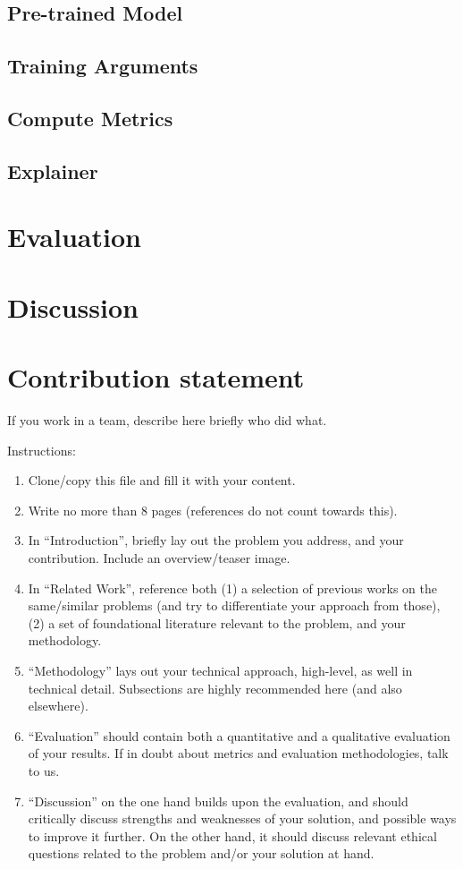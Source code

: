 \documentclass[11pt]{article}
\begin{document}
\subsection{Pre-trained Model}
\subsection{Training Arguments}
\subsection{Compute Metrics}
\subsection{Explainer}

\section{Evaluation}

\section{Discussion}


\section{Contribution statement}

If you work in a team, describe here briefly who did what.

Instructions: 
\begin{enumerate}
    \item Clone/copy this file and fill it with your content.
    \item Write no more than 8 pages (references do not count towards this).
    \item In ``Introduction'', briefly lay out the problem you address, and your contribution. Include an overview/teaser image.
    \item In ``Related Work'', reference both (1) a selection of previous works on the same/similar problems (and try to differentiate your approach from those), (2) a set of foundational literature relevant to the problem, and your methodology.
    \item ``Methodology'' lays out your technical approach, high-level, as well in technical detail. Subsections are highly recommended here (and also elsewhere).
    \item ``Evaluation'' should contain both a quantitative and a qualitative evaluation of your results. If in doubt about metrics and evaluation methodologies, talk to us.
    \item ``Discussion'' on the one hand builds upon the evaluation, and should critically discuss strengths and weaknesses of your solution, and possible ways to improve it further. On the other hand, it should discuss relevant ethical questions related to the problem and/or your solution at hand.
\end{enumerate}


% 
\end{document}
